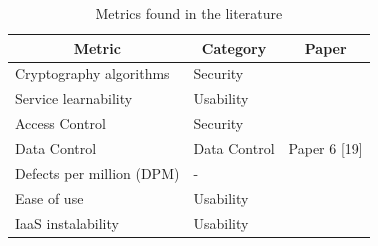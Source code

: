 \documentclass[conference]{IEEEtran}
\begin{document}
\begin{table}[]
\centering
 \caption{Metrics found in the literature}
\label{tab:metricas_literatura}
\begin{tabular}{|l|l|l|}
\hline
\multicolumn{1}{|c|}{\textbf{Metric}}                                                       & \multicolumn{1}{c|}{\textbf{Category}}                                                                    & \multicolumn{1}{c|}{\textbf{Paper}}                                                    \\ \hline
Cryptography algorithms                                                                   & Security                                                                                                  & \multirow{9}{*}{Paper 6 [19]}                                                          \\ \cline{1-2}
Service learnability                                                                  & Usability                                                                                                &                                                                                         \\ \cline{1-2}
Access Control                                                                           & Security                                                                                                  &                                                                                         \\ \cline{1-2}
Data Control                                                                            & Data Control                                                                                          &                                                                                         \\ \cline{1-2}
Defects per million (DPM)                                                                    & -                                                                                                          &                                                                                         \\ \cline{1-2}
Ease of use                                                                            & Usability                                                                                                &                                                                                         \\ \cline{1-2}
IaaS instalability                                                                      & Usability                                                                                                &                                                                                         \\ \cline{1-2}

\end{tabular}
\end{table}
\end{document}
